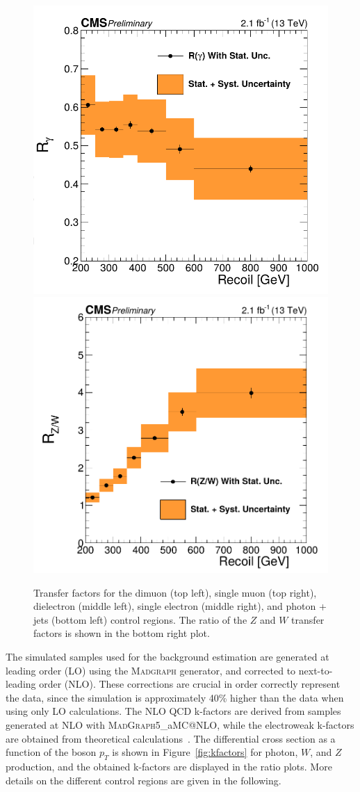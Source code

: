 \begin{figure}[p]
 \vspace{.2cm}
 \includegraphics[width=.49\textwidth]{gamma_TF.png} 
 \includegraphics[width=.5\textwidth]{ZW_ratio.png} 
 \caption{Transfer factors for the dimuon (top left), single muon (top right), dielectron (middle left), single electron (middle right), and photon + jets (bottom left) control regions. The ratio of the $Z$ and $W$ transfer factors is shown in the bottom right plot.}
 \label{fig:TF}
\end{figure}

The simulated samples used for the background estimation are generated at leading order (LO) using the \textsc{Madgraph} generator, and corrected to next-to-leading order (NLO). These corrections are crucial in order correctly represent the data, since the simulation is approximately 40\% higher than the data when using only LO calculations. The NLO QCD k-factors are derived from samples generated at NLO with \textsc{MadGraph5\_}a\textsc{MC@NLO}, while the electroweak k-factors are obtained from theoretical calculations~\cite{Kuhn:2005gv, Kallweit:2015fta, Kallweit:2014xda, Kallweit:2015dum}. The differential cross section as a function of the boson $p_T$ is shown in Figure~\ref{fig:kfactors} for photon, $W$, and $Z$ production, and the obtained k-factors are displayed in the ratio plots. More details on the different control regions are given in the following.

